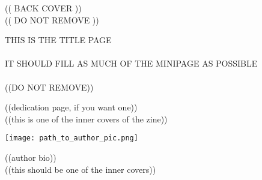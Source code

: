 \documentclass[a4paper,landscape]{article}
\begin{document}
\selectfont


\begin{minipage}[t]{0.45\linewidth}
    \begin{center}
        (( BACK COVER ))\\
        (( DO NOT REMOVE ))
    \end{center}
\end{minipage}
\hspace{0.65in}%
\begin{minipage}[t]{0.467\linewidth}
\vspace*{0.2\textheight}
    \begin{center}
        \huge THIS IS THE TITLE PAGE \\ \\
        \vspace*{0.05\textheight}
        IT SHOULD FILL AS MUCH OF THE MINIPAGE AS POSSIBLE\\ \\
        \vspace*{0.05\textheight}
        ((DO NOT REMOVE))
    \end{center}
\end{minipage}
\newpage

\begin{minipage}[t]{0.45\linewidth}
\vspace*{0.3\textheight}
    \begin{center}
        ((dedication page, if you want one))\\
        ((this is one of the inner covers of the zine))\\
    \end{center}
\end{minipage}%
\hspace{0.75in}%
\begin{minipage}[t]{0.4\linewidth}
\vspace*{0.2\textheight}
    \begin{center}
        \texttt{[image: path\_to\_author\_pic.png]}
    \end{center}
    \begin{center}
        ((author bio))\\
        ((this should be one of the inner covers)) \\
    \end{center}%
\end{minipage}%
\newpage

\end{document}
